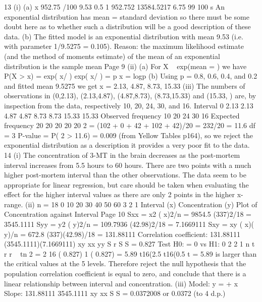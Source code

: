 13 (i) (a) x 952.75 /100 9.53
0.5
1 952.752
13584.5217 6.75
99 100
s
An exponential distribution has mean = standard deviation so there
must be some doubt here as to whether such a distribution will be a
good description of these data.
(b) The fitted model is an exponential distribution with mean 9.53
(i.e. with parameter 1/9.5275 = 0.105).
Reason: the maximum likelihood estimate (and the method of
moments estimate) of the mean of an exponential distribution is the
sample mean
Page 9
(ii) (a) For X ~ exp(mean = ) we have P(X > x) = exp( x/ )
exp( x/ ) = p x = logp
(b) Using p = 0.8, 0.6, 0.4, and 0.2 and fitted mean 9.5275
we get x = 2.13, 4.87, 8.73, 15.33
(iii) The numbers of observations in (0,2.13), (2.13,4.87), (4.87,8.73), (8.73,15.33)
and (15.33, ) are, by inspection from the data, respectively 10, 20, 24, 30,
and 16.
Interval 0 2.13 2.13 4.87 4.87 8.73 8.73 15.33 15.33
Observed frequency 10 20 24 30 16
Expected frequency 20 20 20 20 20
2 = (102 + 0 + 42 + 102 + 42)/20 = 232/20 = 11.6
df = 3
P-value = P( 2 > 11.6) = 0.009 (from Yellow Tables p164), so we reject the
exponential distribution as a description it provides a very poor fit to the
data.
14 (i)
The concentration of 3-MT in the brain decreases as the post-mortem interval
increases from 5.5 hours to 60 hours. There are two points with a much higher
post-mortem interval than the other observations.
The data seem to be appropriate for linear regression, but care should be taken
when evaluating the effect for the higher interval values as there are only 2
points in the higher x-range.
(ii) n = 18
0 10 20 30 40 50 60
3
2
1
Interval (x)
Concentration (y)
Plot of Concentration against Interval
Page 10
Sxx = x2 ( x)2/n
= 9854.5 (337)2/18
= 3545.1111
Syy = y2 ( y)2/n
= 109.7936 (42.98)2/18
= 7.1669111
Sxy = xy ( x)( y)/n
= 672.8 (337)(42.98)/18
= 131.88111
Correlation coefficient:
131.88111
(3545.1111)(7.1669111)
xy
xx yy
S
r
S S
= 0.827
Test H0: = 0 vs H1: 0
2
2
1
n
t r
r
~ tn 2
= 2
16
( 0.827)
1 ( 0.827)
= 5.89
t16(2.5%
t16(0.5%
t = 5.89 is larger than the critical values at the 5%
levels. Therefore reject the null hypothesis that the population correlation
coefficient is equal to zero, and conclude that there is a linear relationship
between interval and concentration.
(iii) Model: y = + x
Slope:
131.88111
3545.1111
xy
xx
S
S
= 0.0372008 or 0.0372 (to 4 d.p.)
